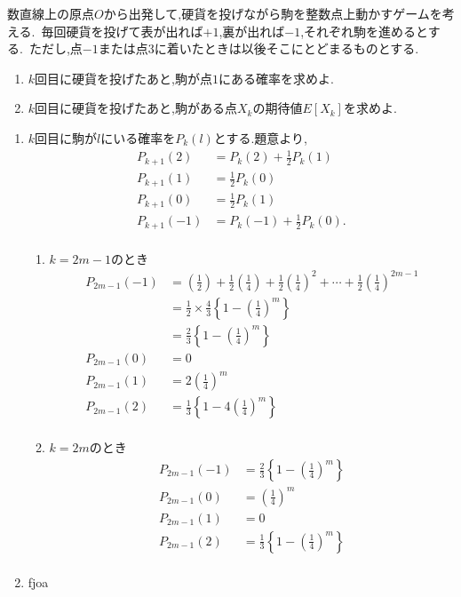 \begin{problem}
数直線上の原点$O$から出発して,硬貨を投げながら駒を整数点上動かすゲームを考える.\, 毎回硬貨を投げて表が出れば$+1$,裏が出れば$-1$,それぞれ駒を進めるとする.\, ただし,点$-1$または点$3$に着いたときは以後そこにとどまるものとする.
  \begin{enumerate}[(1)\ ]
    \item $k$回目に硬貨を投げたあと,駒が点$1$にある確率を求めよ.
    \item $k$回目に硬貨を投げたあと,駒がある点$X_k$の期待値$E[X_k]$を求めよ.
  \end{enumerate}
\end{problem}
\kaie
\begin{enumerate}
  \item $k$回目に駒が$l$にいる確率を$P_k(l)$とする.題意より,
  \begin{align*}
    P_{k+1}(2) &= P_k(2)+\frac12P_k(1)\\
    P_{k+1}(1) &= \frac12P_k(0)\\
    P_{k+1}(0) &= \frac12P_k(1)\\
    P_{k+1}(-1) &= P_k(-1)+\frac12P_k(0).\\
  \end{align*}
  \begin{enumerate}
    \item $k=2m-1$のとき
    \begin{align*}
      P_{2m-1}(-1)
      &= \left(\frac12\right)
        + \frac12\left(\frac14\right)
        + \frac12\left(\frac14\right)^2
        + \cdots
        + \frac12\left(\frac14\right)^{2m-1}\\
      &= \frac12 \times \frac43\left\{1-\left(\frac14\right)^m\right\} \\
      &= \frac23\left\{1-\left(\frac14\right)^m\right\}\\
      P_{2m-1}(0) &= 0\\
      P_{2m-1}(1) &= 2\left(\frac14\right)^{m}\\
      P_{2m-1}(2) &= \frac13\left\{1-4\left(\frac14\right)^m\right\}\\
    \end{align*}
    \item $k=2m$のとき
    \begin{align*}
      P_{2m-1}(-1) &= \frac23\left\{1-\left(\frac14\right)^m\right\}\\
      P_{2m-1}(0) &= \left(\frac14\right)^{m}\\
      P_{2m-1}(1) &= 0\\
      P_{2m-1}(2) &= \frac13\left\{1-\left(\frac14\right)^m\right\}\\
    \end{align*}
  \end{enumerate}


  \item fjoa
\end{enumerate}
